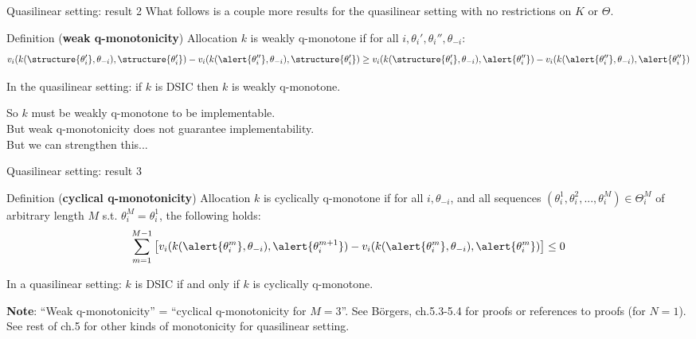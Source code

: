 \documentclass[english,10pt
,aspectratio=169
]{beamer}
\begin{document}
\begin{frame}{Quasilinear setting: result 2}
	What follows is a couple more results for the quasilinear setting with no restrictions on $K$ or $\Theta$.
	\begin{exampleblock}{Definition (\textbf{weak q-monotonicity})}
		Allocation $k$ is \alert{weakly q-monotone} if for all $i,\theta_i',\theta_i'',\theta_{-i}$:
		\begin{equation*}
			v_{i}(k(\structure{\theta_{i}'}, \theta_{-i}), \structure{\theta_{i}'}) - 
			v_{i}(k(\alert{\theta_{i}''}, \theta_{-i}), \structure{\theta_{i}'}) 
			\geq 
			v_{i}(k(\structure{\theta_{i}'}, \theta_{-i}), \alert{\theta_{i}''}) - 
			v_{i}(k(\alert{\theta_{i}''}, \theta_{-i}), \alert{\theta_{i}''}) 
		\end{equation*}
	\end{exampleblock}
	\begin{theorem}
		In the quasilinear setting: if $k$ is DSIC then $k$ is weakly q-monotone.
	\end{theorem}
	So $k$ must be weakly q-monotone to be implementable.\\ 
	But weak q-monotonicity does not guarantee implementability. \\
	But we can strengthen this...
\end{frame}


\begin{frame}{Quasilinear setting: result 3}
	\begin{exampleblock}{Definition (\textbf{cyclical q-monotonicity})}
		Allocation $k$ is \alert{cyclically q-monotone} if for all $i,\theta_{-i}$, and all sequences $(\theta_i^1,\theta_i^2,...,\theta_i^M)\in \Theta_i^M$ of arbitrary length $M$ s.t. $\theta_i^M=\theta_i^1$, the following holds:
		\begin{equation*}
			\sum_{m=1}^{M-1}
			\left[
			v_{i}(k(\alert{\theta_{i}^m}, \theta_{-i}), \alert{\theta_{i}^{m+1}}) - 
			v_{i}(k(\alert{\theta_{i}^{m}}, \theta_{-i}), \alert{\theta_{i}^m}) 
			\right] 
			\leq 0
		\end{equation*}
	\end{exampleblock}
	\begin{theorem}
		In a quasilinear setting: $k$ is DSIC if and only if $k$ is cyclically q-monotone.
	\end{theorem}
	\textbf{Note}: ``Weak q-monotonicity'' = ``cyclical q-monotonicity for $M=3$''.
	See B{\"o}rgers, ch.5.3-5.4 for proofs or references to proofs (for $N=1$). See rest of ch.5 for other kinds of monotonicity for quasilinear setting.
\end{frame}
\end{document}
